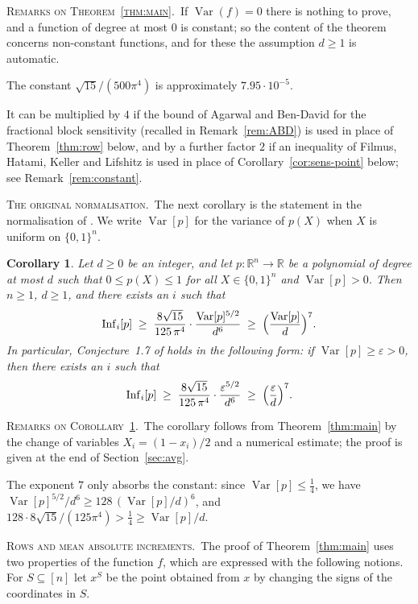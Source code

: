 \documentclass[11pt,reqno]{amsart}
\newtheorem{corollary}[theorem]{Corollary}
\theoremstyle{definition}
\theoremstyle{remark}
\numberwithin{equation}{section}
\theoremstyle{named}
\theoremstyle{plain}
\newcommand{\introhead}[1]{\par\medskip\noindent\textsc{#1.}\ }
\newcommand{\R}{\mathbb{R}}
\newcommand{\Var}{\operatorname{Var}}
\newcommand{\Inf}{\operatorname{Inf}}
\newcommand{\eps}{\varepsilon}
\begin{document}
\introhead{Remarks on Theorem~\ref{thm:main}}If $\Var(f)=0$ there is nothing to prove, and a function of degree at most $0$ is constant; so the content of the
theorem concerns non-constant functions, and for these the assumption $d\ge 1$ is automatic.

The constant $\sqrt{15}/(500\pi^{4})$ is approximately $7.95\cdot10^{-5}$.

It can be multiplied
by $4$ if the bound of Agarwal and Ben-David \cite{ABD} for the fractional block sensitivity
(recalled in Remark~\ref{rem:ABD}) is used in place of
Theorem~\ref{thm:row} below, and by a further factor $2$ if an inequality of Filmus, Hatami,
Keller and Lifshitz \cite{FHKL} is used in place of Corollary~\ref{cor:sens-point} below; see
Remark~\ref{rem:constant}.

\introhead{The original normalisation}The next corollary is the statement in the normalisation of \cite{AA14}. We write $\Var[p]$ for the
variance of $p(X)$ when $X$ is uniform on $\{0,1\}^{n}$.

\begin{corollary}\label{cor:AA01}
Let $d\ge0$ be an integer, and let $p\colon\R^{n}\to\R$ be a polynomial of degree at most $d$ such
that $0\le p(X)\le 1$ for all $X\in\{0,1\}^{n}$ and $\Var[p]>0$. Then $n\ge 1$, $d\ge 1$, and there
exists an $i$ such that
\[
   \Inf_i[p]\;\ge\;\frac{8\sqrt{15}}{125\,\pi^{4}}\cdot\frac{\Var[p]^{5/2}}{d^{6}}
   \;\ge\;\Bigl(\frac{\Var[p]}{d}\Bigr)^{7}.
\]
In particular, Conjecture~1.7 of \cite{AA14} holds in the following form: if\/
$\Var[p]\ge\eps>0$, then there exists an $i$ such that
\[
   \Inf_i[p]\;\ge\;\frac{8\sqrt{15}}{125\,\pi^{4}}\cdot\frac{\eps^{5/2}}{d^{6}}
   \;\ge\;\Bigl(\frac{\eps}{d}\Bigr)^{7}.
\]
\end{corollary}

\introhead{Remarks on Corollary~\ref{cor:AA01}}The corollary follows from Theorem~\ref{thm:main} by the change of variables $X_i=(1-x_i)/2$ and a
numerical estimate; the proof is given at the end of Section~\ref{sec:avg}.

The exponent $7$ only
absorbs the constant: since $\Var[p]\le\frac14$, we have
$\Var[p]^{5/2}/d^{6}\ge128\,(\Var[p]/d)^{6}$, and
$128\cdot8\sqrt{15}/(125\pi^{4})>\frac14\ge\Var[p]/d$.

\introhead{Rows and mean absolute increments}The proof of Theorem~\ref{thm:main} uses two properties of the function $f$, which are expressed
with the following notions. For $S\subseteq[n]$ let $x^{S}$ be the point obtained from $x$ by
changing the signs of the coordinates in $S$.
\end{document}

